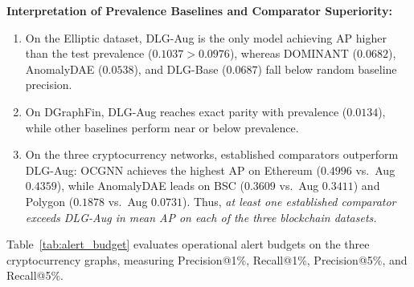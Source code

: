 \documentclass[applsci,article,submit,moreauthors,pdftex]{Definitions/mdpi}
\begin{document}
\textbf{Interpretation of Prevalence Baselines and Comparator Superiority:}
\begin{enumerate}
    \item On the Elliptic dataset, DLG-Aug is the only model achieving AP higher than the test prevalence ($0.1037 > 0.0976$), whereas DOMINANT ($0.0682$), AnomalyDAE ($0.0538$), and DLG-Base ($0.0687$) fall below random baseline precision.
    \item On DGraphFin, DLG-Aug reaches exact parity with prevalence ($0.0134$), while other baselines perform near or below prevalence.
    \item On the three cryptocurrency networks, established comparators outperform DLG-Aug: OCGNN achieves the highest AP on Ethereum ($0.4996$ vs.\ Aug $0.4359$), while AnomalyDAE leads on BSC ($0.3609$ vs.\ Aug $0.3411$) and Polygon ($0.1878$ vs.\ Aug $0.0731$). Thus, \textit{at least one established comparator exceeds DLG-Aug in mean AP on each of the three blockchain datasets.}
\end{enumerate}

Table~\ref{tab:alert_budget} evaluates operational alert budgets on the three cryptocurrency graphs, measuring Precision@1\%, Recall@1\%, Precision@5\%, and Recall@5\%.
\end{document}
